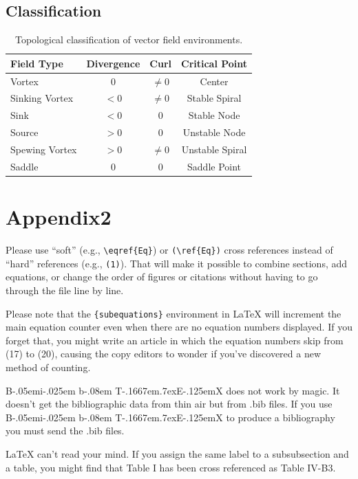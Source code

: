 \documentclass[lettersize,journal]{IEEEtran}
\def\BibTeX{{\rm B\kern-.05em{\sc i\kern-.025em b}\kern-.08em
    T\kern-.1667em\lower.7ex\hbox{E}\kern-.125emX}}
\begin{document}
\subsection{Classification}

\begin{table}[h]
\centering
\begin{tabular}{lccc}
\hline
\textbf{Field Type} & \textbf{Divergence} & \textbf{Curl} & \textbf{Critical Point} \\
\hline
Vortex & 0 & $\neq 0$ & Center \\
Sinking Vortex & $< 0$ & $\neq 0$ & Stable Spiral \\
Sink & $< 0$ & 0 & Stable Node \\
Source & $> 0$ & 0 & Unstable Node \\
Spewing Vortex & $> 0$ & $\neq 0$ & Unstable Spiral \\
Saddle & 0 & 0 & Saddle Point \\
\hline
\end{tabular}
\caption{Topological classification of vector field environments.}
\label{tab:field_summary}
\end{table}


\section{Appendix2}

Please use ``soft'' (e.g., \verb|\eqref{Eq}|) or \verb|(\ref{Eq})|
cross references instead of ``hard'' references (e.g., \verb|(1)|).
That will make it possible to combine sections, add equations, or
change the order of figures or citations without having to go through
the file line by line.

Please note that the \verb|{subequations}| environment in {\LaTeX}
will increment the main equation counter even when there are no
equation numbers displayed. If you forget that, you might write an
article in which the equation numbers skip from (17) to (20), causing
the copy editors to wonder if you've discovered a new method of
counting.

{\BibTeX} does not work by magic. It doesn't get the bibliographic
data from thin air but from .bib files. If you use {\BibTeX} to produce a
bibliography you must send the .bib files. 

{\LaTeX} can't read your mind. If you assign the same label to a
subsubsection and a table, you might find that Table I has been cross
referenced as Table IV-B3. 
\end{document}

